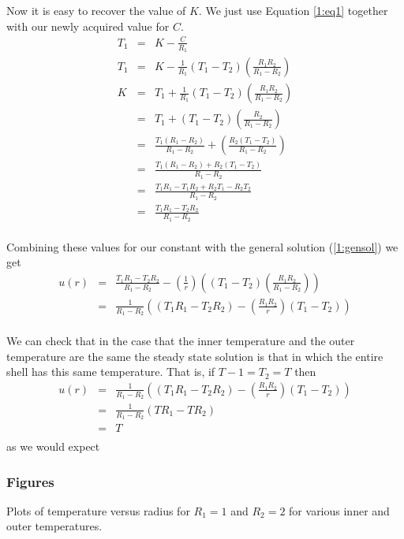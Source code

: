 \documentclass[12pt]{article}
\begin{document}
Now it is easy to recover the value of $K$. We just use Equation \ref{1:eq1} together with our newly acquired value for $C$.
\begin{eqnarray*}
T_1 &=&  K - \frac{C}{R_1} \\
 T_1 &=&  K - \frac{1}{R_1} \left(T_1 - T_2 \right) \left( \frac{ R_1 R_2}{R_1 - R_2} \right)   \\
 K &=&  T_1 + \frac{1}{R_1} \left(T_1 - T_2 \right) \left( \frac{ R_1 R_2}{R_1 - R_2} \right)   \\
   &=&  T_1 + \left(T_1 - T_2 \right) \left( \frac{R_2}{R_1 - R_2} \right)   \\
    &=& \frac{T_1 (R_1-R_2)}{R_1-R_2}+ \left( \frac{R_2 \left(T_1 - T_2 \right) }{R_1 - R_2} \right)   \\
        &=& \frac{T_1 (R_1-R_2)+R_2 \left(T_1 - T_2 \right) }{R_1 - R_2}  \\
   &=& \frac{T_1 R_1-T_1 R_2+R_2  T_1 -  R_2 T_2  }{R_1 - R_2}  \\
   &=& \frac{T_1 R_1 - T_2   R_2 }{R_1 - R_2}  \\
\end{eqnarray*}

Combining these values for our constant with the general solution (\ref{1:gensol}) we get
\begin{eqnarray*}
u(r) &=&   \frac{T_1 R_1 - T_2   R_2 }{R_1 - R_2}   - \left( \frac{1}{r} \right) \left( \left(T_1 - T_2 \right) \left( \frac{ R_1 R_2}{R_1 - R_2} \right)  \right) \\
&=&  \frac{1}{R_1 - R_2}  \left(  \left( T_1 R_1 - T_2   R_2 \right)   - \left( \frac{ R_1 R_2 }{r} \right)  \left(T_1 - T_2 \right)  \right) \\
\end{eqnarray*}

We can check that in the case that the inner temperature and the outer temperature are the same the steady state solution is that in which the entire shell has this same temperature. That is, if $T-1=T_2=T$ then
\begin{eqnarray*}
u(r) &=&  \frac{1}{R_1 - R_2}  \left(  \left( T_1 R_1 - T_2   R_2 \right)   - \left( \frac{ R_1 R_2 }{r} \right)  \left(T_1 - T_2 \right)  \right) \\
&=&  \frac{1}{R_1 - R_2}    \left( T R_1 - T   R_2 \right) \\
&=&  T\\
\end{eqnarray*}
as we would expect

\subsubsection{Figures}
Plots of temperature versus radius for $R_1=1$ and $R_2=2$ for various inner and outer temperatures.
\end{document}
